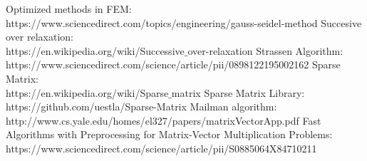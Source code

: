 \documentclass[12pt,a3paper]{article}
\begin{document}
\begin{thebibliography}{9}
 Optimized methods in FEM:\\
https://www.sciencedirect.com/topics/engineering/gauss-seidel-method
Succesive over relaxation:\\
https://en.wikipedia.org/wiki/Successive$\_$over-relaxation
Strassen Algorithm:\\
https://www.sciencedirect.com/science/article/pii/0898122195002162
Sparse Matrix:\\
https://en.wikipedia.org/wiki/Sparse$\_$matrix
Sparse Matrix Library:\\
https://github.com/uestla/Sparse-Matrix
Mailman algorithm:\\
http://www.cs.yale.edu/homes/el327/papers/matrixVectorApp.pdf
Fast Algorithms with Preprocessing for Matrix-Vector Multiplication Problems:\\
https://www.sciencedirect.com/science/article/pii/S0885064X84710211
\end{thebibliography}
\end{document}
